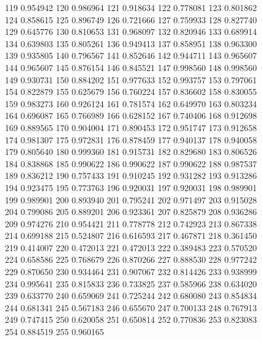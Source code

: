 \begin{figure}
{    119   0.954942
    120   0.986964
    121   0.918634
    122   0.778081
    123   0.801862
    124   0.858615
    125   0.896749
    126   0.721666
    127   0.759933
    128   0.827740
    129   0.645776
    130   0.810653
    131   0.968097
    132   0.820946
    133   0.689914
    134   0.639803
    135   0.805261
    136   0.949413
    137   0.858951
    138   0.963300
    139   0.935805
    140   0.796567
    141   0.852646
    142   0.944711
    143   0.965607
    144   0.965607
    145   0.876154
    146   0.845521
    147   0.998560
    148   0.998560
    149   0.930731
    150   0.884202
    151   0.977633
    152   0.993757
    153   0.797061
    154   0.822879
    155   0.625679
    156   0.760224
    157   0.836602
    158   0.830055
    159   0.983273
    160   0.926124
    161   0.781574
    162   0.649970
    163   0.803234
    164   0.696087
    165   0.766989
    166   0.628152
    167   0.740406
    168   0.912698
    169   0.889565
    170   0.904004
    171   0.890453
    172   0.951747
    173   0.912658
    174   0.981307
    175   0.972831
    176   0.878459
    177   0.940137
    178   0.940058
    179   0.805640
    180   0.999360
    181   0.915731
    182   0.829680
    183   0.806526
    184   0.838868
    185   0.990622
    186   0.990622
    187   0.990622
    188   0.987537
    189   0.836212
    190   0.757433
    191   0.910245
    192   0.931282
    193   0.913286
    194   0.923475
    195   0.773763
    196   0.920031
    197   0.920031
    198   0.989901
    199   0.989901
    200   0.893940
    201   0.795241
    202   0.971497
    203   0.915028
    204   0.799086
    205   0.889201
    206   0.923361
    207   0.825879
    208   0.936286
    209   0.974276
    210   0.954421
    211   0.778778
    212   0.742923
    213   0.867338
    214   0.699188
    215   0.524807
    216   0.616593
    217   0.467871
    218   0.361450
    219   0.414007
    220   0.472013
    221   0.472013
    222   0.389483
    223   0.570520
    224   0.658586
    225   0.768679
    226   0.870266
    227   0.888530
    228   0.977242
    229   0.870650
    230   0.934464
    231   0.907067
    232   0.814426
    233   0.938999
    234   0.995641
    235   0.815833
    236   0.733825
    237   0.585966
    238   0.634020
    239   0.633770
    240   0.659069
    241   0.725244
    242   0.680080
    243   0.854834
    244   0.681341
    245   0.567183
    246   0.655670
    247   0.700133
    248   0.767913
    249   0.747415
    250   0.620058
    251   0.650814
    252   0.770836
    253   0.823083
    254   0.884519
    255   0.960165
}
\end{figure}
